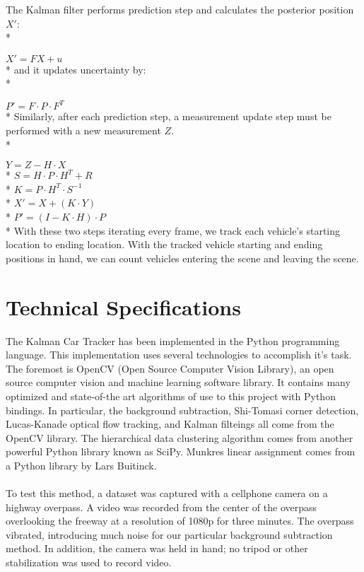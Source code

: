 \documentclass[draft]{article} %
\begin{document}
The Kalman filter performs prediction step and calculates the posterior position $X'$:\\*

{\centering
$X' = FX+u$\linebreak\newline\\*}
and it updates uncertainty by:\\*

{\centering
$P' = F \cdot P \cdot F^T$\linebreak\newline\\*}
Similarly, after each prediction step, a measurement update step must be performed with a new measurement $Z$.\\*

{\centering
$Y = Z - H \cdot X$\\*
 $S = H \cdot P \cdot H^T + R$\\*
 $K = P \cdot H^T \cdot S^{-1}$\\*
 $X' = X + (K\cdot Y)$\\*
 $P' = (I - K \cdot H) \cdot P $\linebreak\newline\\*}
 With these two steps iterating every frame, we track each vehicle's starting location to ending location. With the tracked vehicle starting and ending positions in hand, we can count vehicles entering the scene and leaving the scene.
 
\section{Technical Specifications}
\label{sec:technical_specs}

The Kalman Car Tracker has been implemented in the Python programming language. This implementation uses several technologies to accomplish it's task. The foremost is OpenCV (Open Source Computer Vision Library), an open source computer vision and machine learning software library. It contains many optimized and state-of-the art algorithms of use to this project with Python bindings. In particular, the background subtraction, Shi-Tomasi corner detection, Lucas-Kanade optical flow tracking, and Kalman filteings all come from the OpenCV library. The hierarchical data clustering algorithm comes from another powerful Python library known as SciPy. Munkres linear assignment comes from a Python library by Lars Buitinck.
\paragraph{}To test this method, a dataset was captured with a cellphone camera on a highway overpass. A video was recorded from the center of the overpass overlooking the freeway at a resolution of 1080p for three minutes. The overpass vibrated, introducing much noise for our particular background subtraction method. In addition, the camera was held in hand; no tripod or other stabilization was used to record video.
\end{document}
